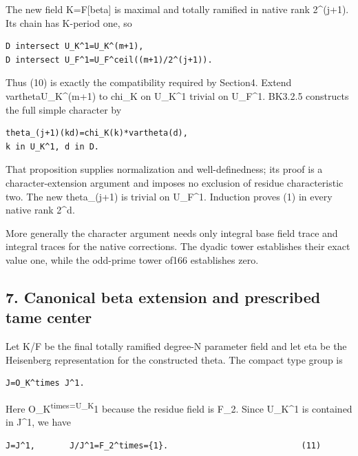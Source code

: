 The new field K=F{[}beta{]} is maximal and totally ramified in native
rank 2\^{}(j+1). Its chain has K-period one, so

\begin{Verbatim}[fontsize=\small,breaklines=true,breakanywhere=true]
D intersect U_K^1=U_K^(m+1),
D intersect U_F^1=U_F^ceil((m+1)/2^(j+1)).
\end{Verbatim}

Thus (10) is exactly the compatibility required by Section4. Extend
vartheta\textbar U\_K\^{}(m+1) to chi\_K on U\_K\^{}1 trivial on
U\_F\^{}1. BK3.2.5 constructs the full simple character by

\begin{Verbatim}[fontsize=\small,breaklines=true,breakanywhere=true]
theta_(j+1)(kd)=chi_K(k)*vartheta(d),
k in U_K^1, d in D.
\end{Verbatim}

That proposition supplies normalization and well-definedness; its proof
is a character-extension argument and imposes no exclusion of residue
characteristic two. The new theta\_(j+1) is trivial on U\_F\^{}1.
Induction proves (1) in every native rank 2\^{}d.

More generally the character argument needs only integral base field
trace and integral traces for the native corrections. The dyadic tower
establishes their exact value one, while the odd-prime tower of166
establishes zero.

\hypertarget{dyadic_character-canonical-beta-extension-and-prescribed-tame-center}{%
\subsection{7. Canonical beta extension and prescribed tame
center}\label{dyadic_character-canonical-beta-extension-and-prescribed-tame-center}}

Let K/F be the final totally ramified degree-N parameter field and let
eta be the Heisenberg representation for the constructed theta. The
compact type group is

\begin{Verbatim}[fontsize=\small,breaklines=true,breakanywhere=true]
J=O_K^times J^1.
\end{Verbatim}

Here O\_K\textsuperscript{times=U\_K}1 because the residue field is
F\_2. Since U\_K\^{}1 is contained in J\^{}1, we have

\begin{Verbatim}[fontsize=\small,breaklines=true,breakanywhere=true]
J=J^1,       J/J^1=F_2^times={1}.                           (11)
\end{Verbatim}

